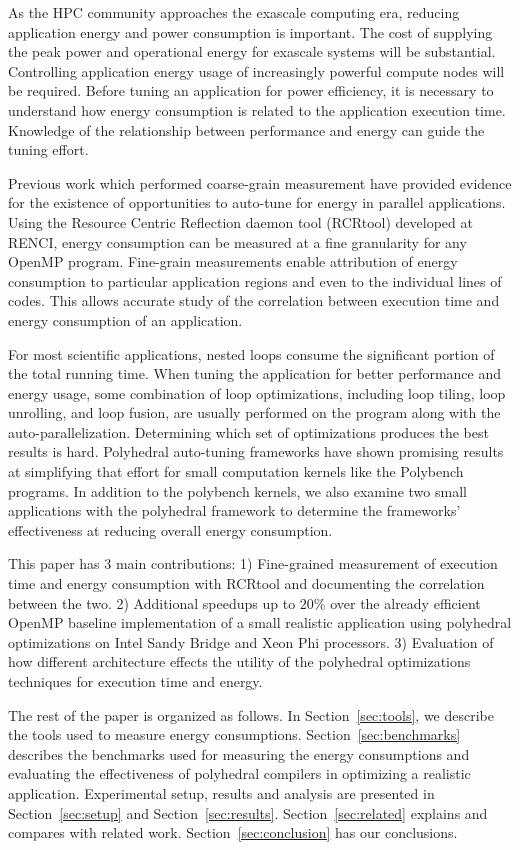 As the HPC community approaches the exascale computing era, reducing application energy 
and power consumption is important. The cost of supplying the peak power and 
operational energy for exascale systems will be substantial. 
Controlling application energy usage of increasingly powerful
compute nodes will be required. 
Before tuning an application for power efficiency, it is necessary to 
understand how energy consumption is related to the application execution time.  
Knowledge of the relationship between performance and energy can guide the tuning effort.

Previous work which performed coarse-grain measurement have provided evidence for the 
existence of opportunities to auto-tune for energy in parallel applications\cite{Tiwari:EnergyAutoTune}.
Using the Resource Centric Reflection daemon tool (RCRtool) developed at RENCI\cite{us}, 
energy 
consumption can be measured at a fine granularity for any OpenMP program. Fine-grain measurements
enable attribution of energy consumption to particular application regions and 
even to the individual lines of codes. This allows accurate study of the correlation between execution time
and energy consumption of an application.

For most scientific applications, nested loops consume the significant 
portion of the total running time. When tuning the application for
better performance and energy usage, some combination of loop optimizations, including loop 
tiling, loop unrolling, and loop fusion, are usually performed on the 
program along with the auto-parallelization.
Determining which set of optimizations produces the best results is hard.
Polyhedral auto-tuning frameworks have shown promising results at simplifying that effort\cite{EJ2011,EJ2012,EJ2013}
for small computation kernels like the Polybench programs\cite{Polybench}. 
In addition to the polybench kernels, we also examine two small applications with the polyhedral framework
to determine the frameworks' effectiveness at reducing overall energy consumption.

This paper has 3 main contributions: 1)  
Fine-grained measurement of execution time and energy consumption with RCRtool
and documenting the correlation between the two. 
2) Additional speedups up to $20\%$ over the already efficient OpenMP baseline 
implementation of a small realistic application using polyhedral optimizations 
on Intel Sandy Bridge and Xeon Phi processors. 3) 
Evaluation of how different architecture effects the utility of the 
polyhedral optimizations techniques for execution time and energy.

The rest of the paper is organized as follows. In Section~\ref{sec:tools}, we describe the tools
used to measure energy consumptions. Section~\ref{sec:benchmarks} describes the benchmarks used for  
measuring the energy consumptions and evaluating the effectiveness of polyhedral 
compilers in optimizing a realistic application. Experimental setup, results and analysis are presented in Section~\ref{sec:setup} and Section~\ref{sec:results}. 
Section~\ref{sec:related} explains and compares with related work. Section~\ref{sec:conclusion} has 
our conclusions.


